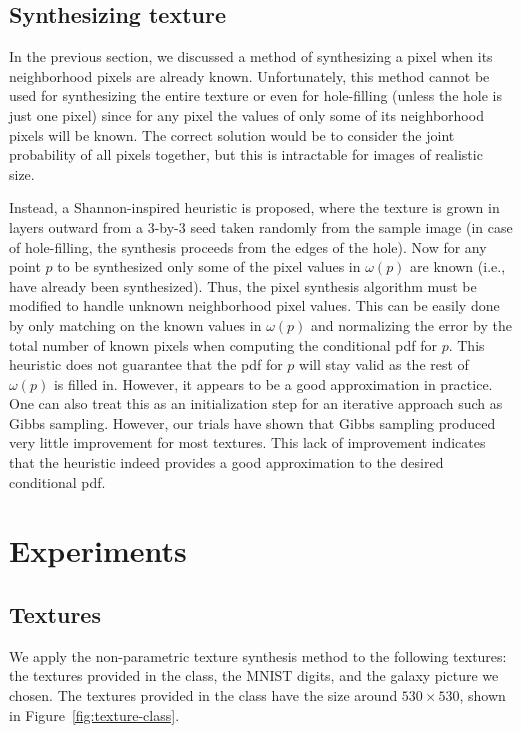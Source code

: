 \documentclass{article}
\begin{document}
\subsection{Synthesizing texture}
In the previous section, we discussed a method of synthesizing a pixel when its neighborhood pixels are already known. Unfortunately, this method cannot be used for synthesizing the entire texture or even for hole-filling (unless the hole is just one pixel) since for any pixel the values of only some of its neighborhood pixels will be known. The correct solution would be to consider the joint probability of all pixels together, but this is intractable for images of realistic size.

Instead, a Shannon-inspired heuristic is proposed, where the texture is grown in layers outward from a 3-by-3 seed taken randomly from the sample image (in case of hole-filling, the synthesis proceeds from the edges of the hole). Now for any point \( p \) to be synthesized only some of the pixel values in \( \omega(p) \) are known (i.e., have already been synthesized). Thus, the pixel synthesis algorithm must be modified to handle unknown neighborhood pixel values. This can be easily done by only matching on the known values in \( \omega(p) \) and normalizing the error by the total number of known pixels when computing the conditional pdf for \( p \). This heuristic does not guarantee that the pdf for \( p \) will stay valid as the rest of \( \omega(p) \) is filled in. However, it appears to be a good approximation in practice. One can also treat this as an initialization step for an iterative approach such as Gibbs sampling. However, our trials have shown that Gibbs sampling produced very little improvement for most textures. This lack of improvement indicates that the heuristic indeed provides a good approximation to the desired conditional pdf.

\section{Experiments}
\subsection{Textures}

We apply the non-parametric texture synthesis method to the following textures: the textures provided in the class, the MNIST digits, and the galaxy picture we chosen. 
The textures provided in the class have the size around $530 \times 530$, shown in Figure~\ref{fig:texture-class}.
\end{document}
